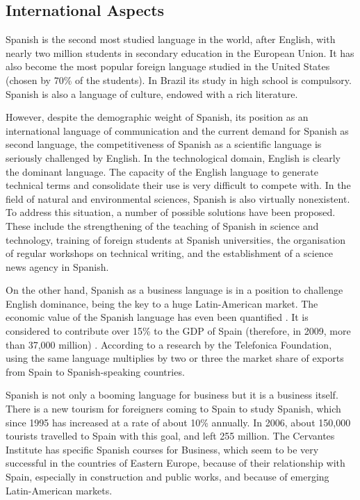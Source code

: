 \begin{multicols}{2}
\subsection{International Aspects}

Spanish is the second most studied language in the world, after English, with nearly two million students in secondary education in the European Union. It has also become the most popular foreign language studied in the United States (chosen by 70\% of the students). In Brazil its study in high school is compulsory. Spanish is also a language of culture, endowed with a rich literature. 

However, despite the demographic weight of Spanish, its position as an international language of communication and the current demand for Spanish as second language, the competitiveness of Spanish as a scientific language is seriously challenged by English. In the technological domain, English is clearly the dominant language. The capacity of the English language to generate technical terms and consolidate their use is very difficult to compete with. In the field of natural and environmental sciences, Spanish is also virtually nonexistent. To address this situation, a number of possible solutions have been proposed. These include the strengthening of the teaching of Spanish in science and technology, training of foreign students at Spanish universities, the organisation of regular workshops on technical writing, and the establishment of a science news agency in Spanish.

On the other hand, Spanish as a business language is in a position to challenge English dominance, being the key to a huge Latin-American market. The economic value of the Spanish language has even been quantified  \cite{ecospanish1}.  It is considered to contribute over 15\% to the GDP of Spain (therefore, in 2009, more than 37,000 million) \cite{ecospanish2}. According to a research by the Telefonica Foundation, using the same language multiplies by two or three the market share of exports from Spain to Spanish-speaking countries.


Spanish is not only a booming language for business but it is a business itself. There is a new tourism for foreigners coming to Spain to study Spanish, which since 1995 has increased at a rate of about 10\% annually.  In 2006, about 150,000 tourists travelled to Spain with this goal, and left 255 million. The Cervantes Institute has specific Spanish courses for Business, which seem to be very successful in the countries of Eastern Europe, because of their relationship with Spain, especially in construction and public works, and because of emerging Latin-American markets.


\end{multicols}
